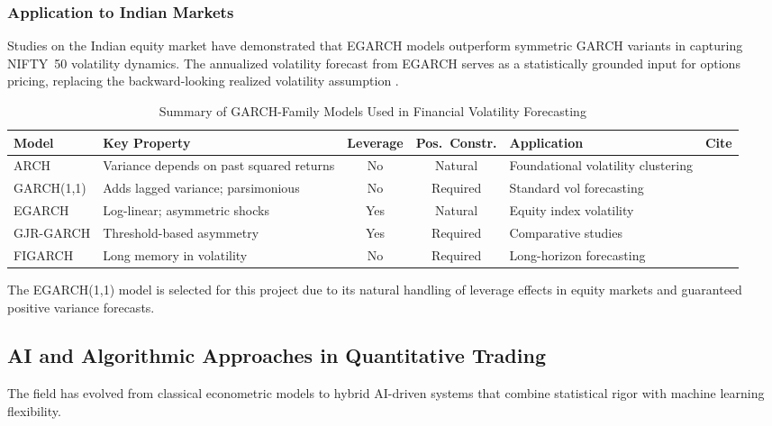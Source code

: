 \documentclass[journal]{IEEEtran}
\begin{document}
\subsubsection{Application to Indian Markets}
Studies on the Indian equity market have demonstrated that EGARCH
models outperform symmetric GARCH variants in capturing NIFTY~50
volatility dynamics. The annualized volatility forecast from EGARCH
serves as a statistically grounded input for options pricing,
replacing the backward-looking realized volatility assumption
\cite{kumar2023,patel2024}.

\begin{table}[!ht]
\centering
\caption{Summary of GARCH-Family Models Used in Financial Volatility
Forecasting}
\label{tab:garch_models}
\small
\begin{tabularx}{\textwidth}{l X c c X l}
\toprule
\textbf{Model} & \textbf{Key Property} & \textbf{Leverage} &
\textbf{Pos.\ Constr.} & \textbf{Application} & \textbf{Cite} \\
\midrule
ARCH       & Variance depends on past squared returns & No  & Natural  &
  Foundational volatility clustering & \cite{engle1982} \\
GARCH(1,1) & Adds lagged variance; parsimonious      & No  & Required &
  Standard vol forecasting           & \cite{bollerslev1986} \\
EGARCH     & Log-linear; asymmetric shocks            & Yes & Natural  &
  Equity index volatility            & \cite{nelson1991} \\
GJR-GARCH  & Threshold-based asymmetry               & Yes & Required &
  Comparative studies                & \cite{tsay2010} \\
FIGARCH    & Long memory in volatility                & No  & Required &
  Long-horizon forecasting           & \cite{tsay2010} \\
\bottomrule
\end{tabularx}
\end{table}

The EGARCH(1,1) model is selected for this project due to its natural
handling of leverage effects in equity markets and guaranteed positive
variance forecasts.

\subsection{AI and Algorithmic Approaches in Quantitative Trading}

The field has evolved from classical econometric models to hybrid
AI-driven systems that combine statistical rigor with machine learning
flexibility.
\end{document}
